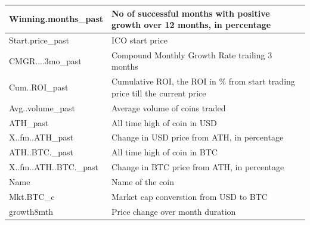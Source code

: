 \documentclass[11pt, english, letterpaper]{article}
\begin{document}
\begin{longtable}{|p{5cm}|p{10cm}|}
Winning.months\_past   & No of successful months with positive growth over 12 months, in percentage                                                                      \\ \hline
Start.price\_past      & ICO start price                                                                                                                                 \\ \hline
CMGR....3mo\_past      & Compound Monthly Growth Rate trailing 3 months                                                                                                  \\ \hline
Cum..ROI\_past         & Cumulative ROI, the ROI in \% from start trading price till the current price                                                                   \\ \hline
Avg..volume\_past      & Average volume of coins traded                                                                                                                  \\ \hline
ATH\_past              & All time high of coin in USD                                                                                                                    \\ \hline
X..fm..ATH\_past       & Change in USD price from ATH, in percentage                                                                                                     \\ \hline
ATH..BTC.\_past        & All time high of coin in BTC                                                                                                                    \\ \hline
X..fm..ATH..BTC.\_past & Change in BTC price from ATH, in percentage                                                                                                     \\ \hline
Name                   & Name of the coin                                                                                                                                \\ \hline
Mkt.BTC\_c             & Market cap converstion from USD to BTC                                                                                                          \\ \hline
growth8mth             & Price change over month duration                                                                                                                \\ \hline

\end{longtable}
\end{document}

